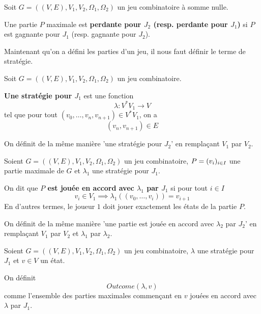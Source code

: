 \documentclass[a4paper, 11pt]{report}
\begin{document}
\begin{definition} 
	Soit $G = ( (V, E), V_{1}, V_{2}, \Omega_{1}, \Omega_{2})$ un jeu
	combinatoire à somme nulle.

	Une partie $P$ maximale est \textbf{perdante pour $J_{2}$ (resp. perdante
	pour $J_{1}$)} si $P$ est gagnante pour $J_{1}$ (resp. gagnante pour
	$J_{2}$).
\end{definition}

Maintenant qu'on a défini les parties d'un jeu, il nous faut définir le terme de
stratégie.

\begin{definition} [Stratégie]
	Soit $G = ( (V, E), V_{1}, V_{2}, \Omega_{1}, \Omega_{2})$ un jeu
	combinatoire.

	\textbf{Une stratégie pour $J_{1}$} est une fonction
	\begin{equation}
		\lambda : V^{*}V_{1} \rightarrow V
	\end{equation}
	tel que pour tout $(v_{0}, \dots, v_{n}, v_{n + 1}) \in V^{*}V_{1}$, on a
	\begin{equation}
		(v_{n}, v_{n + 1}) \in E
	\end{equation}

	On définit de la même manière 'une stratégie pour $J_{2}$' en remplaçant
	$V_{1}$ par $V_{2}$.
\end{definition}


\begin{definition}
	Soient $G = ( (V, E), V_{1}, V_{2}, \Omega_{1}, \Omega_{2})$ un jeu
	combinatoire, $P = (v_{i})_{i \in I}$ une partie maximale de $G$ et
	$\lambda_{1}$ une stratégie pour $J_{1}$.

	On dit que \textbf{$P$ est jouée en accord avec $\lambda_{1}$ par $J_{1}$}
	si pour tout $i \in I$
	\begin{equation}
		v_{i} \in V_{1} \implies \lambda_{1}( (v_{0}, \dots, v_{i}) ) = v_{i + 1}
	\end{equation}
	En d'autres termes, le joueur $1$ doit jouer exactement les états de la
	partie $P$.

	On définit de la même manière 'une partie est jouée en accord avec
	$\lambda_{2}$ par $J_{2}$' en remplaçant $V_{1}$ par $V_{2}$ et $\lambda_{1}$
	par $\lambda_{2}$.
\end{definition}

\begin{definition}
	Soient $G = ( (V, E), V_{1}, V_{2}, \Omega_{1}, \Omega_{2})$ un jeu
	combinatoire, $\lambda$ une stratégie pour $J_{1}$ et $v \in V$ un
	état.

	On définit
	\begin{equation}
		Outcome(\lambda, v)
	\end{equation}
	comme l'ensemble des parties maximales commençant en $v$ jouées en accord
	avec $\lambda$ par $J_{1}$.
\end{definition}
\end{document}
